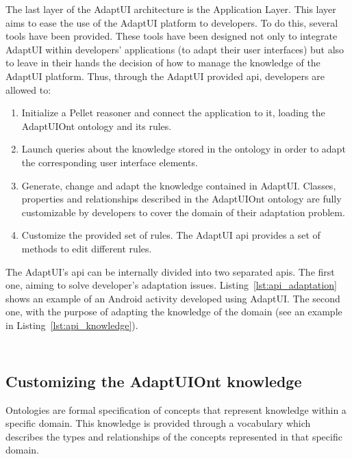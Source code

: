 The last layer of the AdaptUI architecture is the Application Layer. This layer
aims to ease the use of the AdaptUI platform to developers. To do this, several
tools have been provided. These tools have been designed not only to integrate
AdaptUI within developers' applications (to adapt their user interfaces) but also
to leave in their hands the decision of how to manage the knowledge of the AdaptUI
platform. Thus, through the AdaptUI provided \ac{api}, developers are allowed to:

\begin{enumerate}[label=\alph*)]
 \item Initialize a Pellet reasoner and connect the application to it, loading
 the AdaptUIOnt ontology and its rules.
 
 \item Launch queries about the knowledge stored in the ontology in order to
 adapt the corresponding user interface elements.
 
 \item Generate, change and adapt the knowledge contained in AdaptUI. Classes,
 properties and relationships described in the AdaptUIOnt ontology are fully
 customizable by developers to cover the domain of their adaptation problem.
 
 \item Customize the provided set of rules. The AdaptUI \ac{api} provides a set of
 methods to edit different rules.
\end{enumerate}

The AdaptUI's \ac{api} can be internally divided into two separated \acp{api}. 
The first one, aiming to solve developer's adaptation issues. 
Listing~\ref{lst:api_adaptation} shows an example of an Android activity 
developed using AdaptUI. The second one, with the purpose of adapting the 
knowledge of the domain (see an example in Listing~\ref{lst:api_knowledge}).

\inputminted[linenos=true, fontsize=\footnotesize, frame=lines]{java}{4_system_architecture/api_adaptation.java}

\inputminted[linenos=true, fontsize=\footnotesize, frame=lines]{java}{4_system_architecture/api_knowledge.java}


\subsection{Customizing the AdaptUIOnt knowledge}
\label{sec:knowledge_editor}
Ontologies are formal specification of concepts that represent knowledge within
a specific domain. This knowledge is provided through a vocabulary which describes
the types and relationships of the concepts represented in that specific domain.

